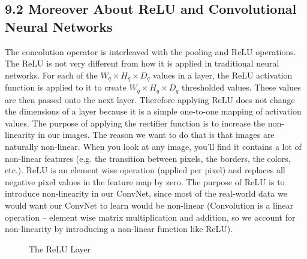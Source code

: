 \documentclass[11pt]{article}
\begin{document}
\subsection{9.2 Moreover About ReLU and Convolutional Neural Networks}
\hspace*{1cm} The concolution operator is interleaved with the pooling and ReLU operations. The ReLU is not very different from how it is applied in traditional neural networks. For each of the $W_q \times H_q \times D_q$ values in a layer, the ReLU activation function is applied to it to create $W_q \times H_q \times D_q$ thresholded values. These values are then passed onto the next layer. Therefore applying ReLU does not change the dimensions of a layer because it is a simple one-to-one mapping of activation values. The purpose of applying the rectifier function is to increase the non-linearity in our images. The reason we want to do that is that images are naturally non-linear. When you look at any image, you'll find it contains a lot of non-linear features (e.g. the transition between pixels, the borders, the colors, etc.). ReLU is an element wise operation (applied per pixel) and replaces all negative pixel values in the feature map by zero. The purpose of ReLU is to introduce non-linearity in our ConvNet, since most of the real-world data we would want our ConvNet to learn would be non-linear (Convolution is a linear operation – element wise matrix multiplication and addition, so we account for non-linearity by introducing a non-linear function like ReLU).	
\begin{figure}[H]
    \centering
    \qquad
    \caption{The ReLU Layer}%
    \label{fig:example}
\end{figure}
\end{document}
